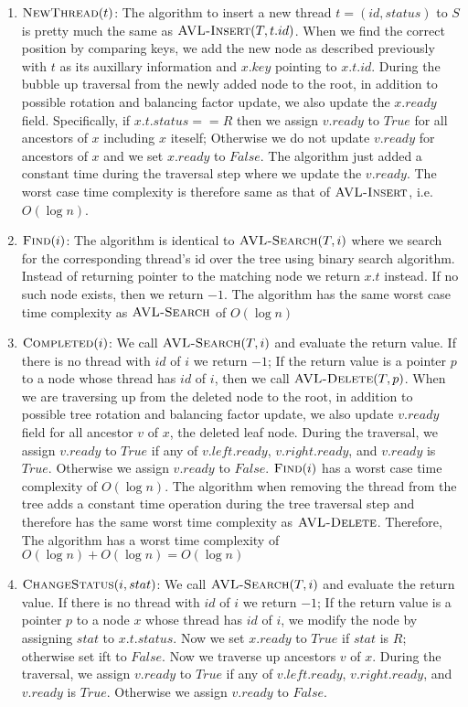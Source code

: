 \documentclass[11pt]{article}
\begin{document}
\begin{enumerate}
  \begin{enumerate}
    \item $\textsc{NewThread}(t)$: The algorithm to insert a new thread $t = (id, status)$ to $S$ is pretty much the same as $\textsc{AVL-Insert}(T, t.id)$. When we find the correct position by comparing keys, we add the new node as described previously with $t$ as its auxillary information and $x.key$ pointing to $x.t.id$. During the bubble up traversal from the newly added node to the root, in addition to possible rotation and balancing factor update, we also update the $x.ready$ field. Specifically, if $x.t.status == R$ then we assign $v.ready$ to $True$ for all ancestors of $x$ including $x$ iteself; Otherwise we do not update $v.ready$ for ancestors of $x$ and we set $x.ready$ to $False$. The algorithm just added a constant time during the traversal step where we update the $v.ready$. The worst case time complexity is therefore same as that of $\textsc{AVL-Insert}$, i.e. $O(\log n)$.
    \item $\textsc{Find}(i)$: The algorithm is identical to $\textsc{AVL-Search}(T, i)$ where we search for the corresponding thread's id over the tree using binary search algorithm. Instead of returning pointer to the matching node we return $x.t$ instead. If no such node exists, then we return $-1$. The algorithm has the same worst case time complexity as $\textsc{AVL-Search}$ of $O (\log n)$
    \item $\textsc{Completed}(i)$: We call $\textsc{AVL-Search}(T, i)$ and evaluate the return value. If there is no thread with $id$ of $i$ we return $-1$; If the return value is a pointer $p$ to a node whose thread has $id$ of $i$, then we call $\textsc{AVL-Delete}(T, p)$. When we are traversing up from the deleted node to the root, in addition to possible tree rotation and balancing factor update, we also update $v.ready$ field for all ancestor $v$ of $x$, the deleted leaf node. During the traversal, we assign $v.ready$ to $True$ if any of $v.left.ready$, $v.right.ready$, and $v.ready$ is $True$. Otherwise we assign $v.ready$ to $False$. $\textsc{Find}(i)$ has a worst case time complexity of $O(\log n)$. The algorithm when removing the thread from the tree adds a constant time operation during the tree traversal step and therefore has the same worst time complexity as $\textsc{AVL-Delete}$. Therefore, The algorithm has a worst time complexity of $O(\log n) + O(\log n) = O(\log n)$
    \item $\textsc{ChangeStatus}(i, stat)$: We call $\textsc{AVL-Search}(T, i)$ and evaluate the return value. If there is no thread with $id$ of $i$ we return $-1$; If the return value is a pointer $p$ to a node $x$ whose thread has $id$ of $i$, we modify the node by assigning $stat$ to $x.t.status$. Now we set $x.ready$ to $True$ if $stat$ is $R$; otherwise set ift to $False$. Now we traverse up ancestors $v$ of $x$. During the traversal, we assign $v.ready$ to $True$ if any of $v.left.ready$, $v.right.ready$, and $v.ready$ is $True$. Otherwise we assign $v.ready$ to $False$.


\end{enumerate}
\end{enumerate}
\end{document}
